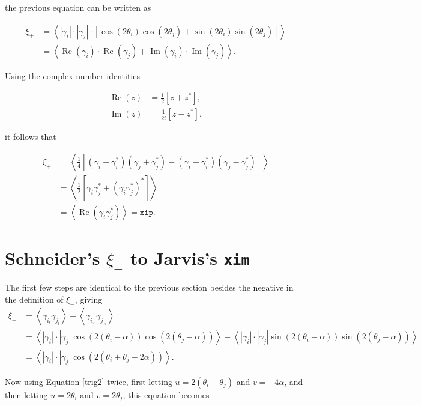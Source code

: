 \documentclass[%
 reprint,
 amsmath,amssymb,
 aps,nofootinbib
]{revtex4-1}
\begin{document}
the previous equation can be written as

\begin{align*}
\xi_+&=\left<|\gamma_i|\cdot|\gamma_j|\cdot\left[\cos\left(2\theta_i\right)\cos\left(2\theta_j\right)+\sin\left(2\theta_i\right)\sin\left(2\theta_j\right)\right]\right>\\
&=\left<\operatorname{Re}(\gamma_i)\cdot\operatorname{Re}(\gamma_j)+\operatorname{Im}(\gamma_i)\cdot\operatorname{Im}(\gamma_j)\right>.
\end{align*}

Using the complex number identities

\begin{align}
\operatorname{Re}(z)&=\frac{1}{2}\left[z+z^*\right],\label{complex1}\\
\operatorname{Im}(z)&=\frac{1}{2i}\left[z-z^*\right]\label{complex2},
\end{align}

it follows that

\begin{align*}
\xi_+&=\left<\frac{1}{4}\left[(\gamma_i+\gamma_i^*)(\gamma_j+\gamma_j^*)-(\gamma_i-\gamma_i^*)(\gamma_j-\gamma_j^*)\right]\right>\\
&=\left<\frac{1}{2}\left[\gamma_i\gamma_j^*+(\gamma_i\gamma_j^*)^*\right]\right>\\
&=\left<\operatorname{Re}(\gamma_i\gamma_j^*)\right>=\texttt{xip}.
\end{align*}

\section*{Schneider's $\xi_-$ to Jarvis's \texttt{xim}}

The first few steps are identical to the previous section besides the negative in the definition of $\xi_-$, giving
\begin{align*}
\xi_-&=\left<\gamma_{i_t}\gamma_{j_t}\right>-\left<\gamma_{i_\times}\gamma_{j_\times}\right>\\
&=\left<|\gamma_i|\cdot|\gamma_j|\cos\left(2(\theta_i-\alpha)\right)\cos\left(2(\theta_j-\alpha)\right)\right>-\left<|\gamma_i|\cdot|\gamma_j|\sin\left(2(\theta_i-\alpha)\right)\sin\left(2(\theta_j-\alpha)\right)\right>\\
&=\left<|\gamma_i|\cdot|\gamma_j|\cos\left(2(\theta_i+\theta_j-2\alpha)\right)\right>.
\end{align*}

Now using Equation \eqref{trig2} twice, first letting $u=2(\theta_i+\theta_j)$ and $v=-4\alpha$, and then letting $u=2\theta_i$ and $v=2\theta_j$, this equation becomes
\end{document}
